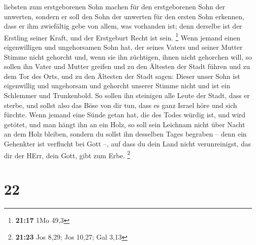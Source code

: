 liebsten zum erstgeborenen Sohn machen für den erstgeborenen Sohn der
unwerten,  sondern er soll den Sohn der unwerten für den
ersten Sohn erkennen, dass er ihm zwiefältig gebe von allem, was
vorhanden ist; denn derselbe ist der Erstling seiner Kraft, und der
Erstgeburt Recht ist sein. \footnote{\textbf{21:17} 1Mo 49,3}
 Wenn jemand einen eigenwilligen und ungehorsamen Sohn
hat, der seines Vaters und seiner Mutter Stimme nicht gehorcht und, wenn
sie ihn züchtigen, ihnen nicht gehorchen will,  so sollen
ihn Vater und Mutter greifen und zu den Ältesten der Stadt führen und zu
dem Tor des Orts,  und zu den Ältesten der Stadt sagen:
Dieser unser Sohn ist eigenwillig und ungehorsam und gehorcht unserer
Stimme nicht und ist ein Schlemmer und Trunkenbold.  So
sollen ihn steinigen alle Leute der Stadt, dass er sterbe, und sollst
also das Böse von dir tun, dass es ganz Israel höre und sich fürchte.
 Wenn jemand eine Sünde getan hat, die des Todes würdig
ist, und wird getötet, und man hängt ihn an ein Holz,  so
soll sein Leichnam nicht über Nacht an dem Holz bleiben, sondern du
sollst ihn desselben Tages begraben -- denn ein Gehenkter ist verflucht
bei Gott --, auf dass du dein Land nicht verunreinigst, das dir der
HErr, dein Gott, gibt zum Erbe. \footnote{\textbf{21:23} Jos 8,29; Jos
  10,27; Gal 3,13}

\hypertarget{section-21}{%
\section{22}\label{section-21}}

